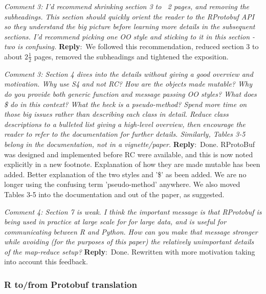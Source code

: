 \documentclass[10pt]{article}
\newcommand{\pointRaised}[2]{\smallskip %
  \textsl{{\fontseries{b}\selectfont #1}: #2}\newline}
\newcommand{\reply}[1]{\textbf{Reply}:\ #1 \smallskip } %
\begin{document}
\pointRaised{Comment 3}{I'd recommend shrinking section 3 to ~2 pages, and removing the
  subheadings. This section should quickly orient the reader to the
  RProtobuf API so they understand the big picture before learning more
  details in the subsequent sections. I'd recommend picking one OO style
  and sticking to it in this section - two is confusing.}
\reply{We followed this recommendation, reduced section 3 to about
  $2\frac{1}{2}$ pages, removed the subheadings and tightened the exposition.}

\pointRaised{Comment 3}{Section 4 dives into the details without giving a good overview and
  motivation. Why use S4 and not RC? How are the objects made mutable?
  Why do you provide both generic function and message passing OO
  styles? What does \$ do in this context? What the heck is a
  pseudo-method? Spend more time on those big issues rather than
  describing each class in detail. Reduce class descriptions to a
  bulleted list giving a high-level overview, then encourage the reader
  to refer to the documentation for further details. Similarly, Tables
  3-5 belong in the documentation, not in a vignette/paper.}
\reply{Done. RProtoBuf was designed and implemented before RC were
  available, and this is now noted explicitly in a new footnote.  Explanation of how
  they are made mutable has been added.  Better explanation of the
  two styles and '\$' as been added.  We are no longer using the
  confusing term 'pseudo-method' anywhere.  We also moved Tables 3-5 into the
  documentation and out of the paper, as suggested.}

\pointRaised{Comment 4}{Section 7 is weak. I think the important message is that RProtobuf is
  being used in practice at large scale for for large data, and is
  useful for communicating between R and Python. How can you make that
  message stronger while avoiding (for the purposes of this paper) the
  relatively unimportant details of the map-reduce setup?}
\reply{Done.  Rewritten with more motivation taking into account this feedback.}

\subsubsection*{R to/from Protobuf translation}
\end{document}
